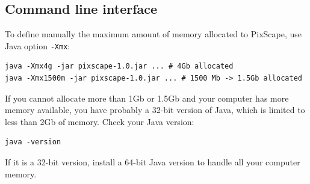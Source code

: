 \documentclass{report}
\begin{document}
\subsection{Command line interface}
To define manually the maximum amount of memory allocated to PixScape, use Java option \verb|-Xmx|:

\begin{Verbatim}
java -Xmx4g -jar pixscape-1.0.jar ... # 4Gb allocated
java -Xmx1500m -jar pixscape-1.0.jar ... # 1500 Mb -> 1.5Gb allocated
\end{Verbatim}

If you cannot allocate more than 1Gb or 1.5Gb and your computer has more memory available, you have
probably a 32-bit version of Java, which is limited to less than 2Gb of memory.  Check your Java version:
\begin{Verbatim}
java -version
\end{Verbatim}
If it is a 32-bit version, install a 64-bit Java version to handle all your computer memory.


\end{document}
